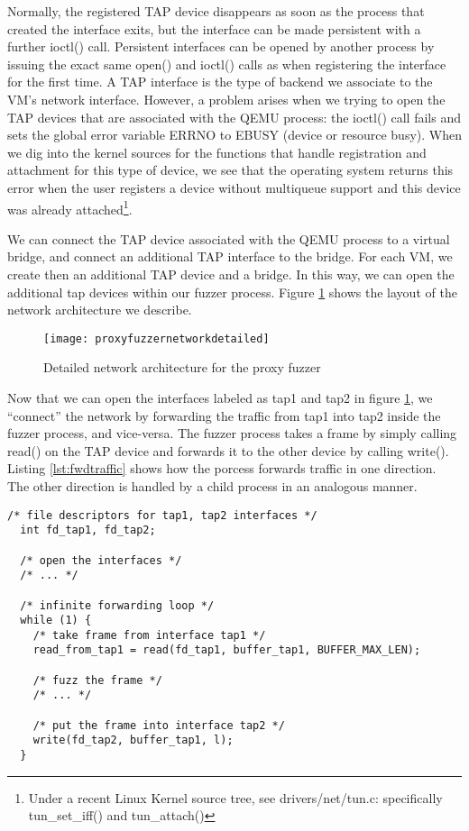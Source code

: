 Normally, the registered TAP device disappears as soon as the process that created the interface exits, but
the interface can be made persistent with a further ioctl() call. Persistent interfaces can be opened
by another process by issuing the exact same open() and ioctl() calls as when registering the interface
for the first time.
A TAP interface is the type of backend we associate to the VM's network interface. However, a problem arises
when we trying to open the TAP devices that are associated with the QEMU process: the ioctl() call
fails and sets the global error variable ERRNO to EBUSY (device or resource busy). When
we dig into the kernel sources for the functions that handle registration and attachment for this type of device,
we see that the operating system returns  this error when the user registers a device without multiqueue support and this device was already
attached\footnote{Under a recent Linux Kernel source tree, see drivers/net/tun.c: specifically tun\_set\_iff() and tun\_attach() }.


We can connect the TAP device associated with the QEMU process to a virtual bridge, and connect an additional TAP interface to the bridge.
For each VM, we create then an additional TAP device and a bridge. In this way, we can open the additional tap devices within our fuzzer
process. Figure \ref{fig:networkdetailed} shows the layout of the network architecture we describe.

\begin{figure}[h]
  \centering
  \texttt{[image: proxyfuzzernetworkdetailed]}
  \caption[Proxy fuzzer network architecture]{Detailed network architecture for the proxy fuzzer}
  \label{fig:networkdetailed}
\end{figure}

Now that we can open the interfaces labeled as tap1 and tap2 in figure \ref{fig:networkdetailed}, we ``connect'' the
network by forwarding the traffic from tap1 into tap2 inside the fuzzer process, and vice-versa. The fuzzer
process takes a frame by simply calling read() on the TAP device and forwards it to the other device by calling write().
Listing \ref{lst:fwdtraffic} shows how the porcess forwards traffic in one direction. The other direction is handled by a
child process in an analogous manner.

\begin{lstlisting}[caption={Forwarding traffic in the proxy fuzzer process}, label={lst:fwdtraffic},  style=CStyle, float, floatplacement=H]
  /* file descriptors for tap1, tap2 interfaces */
  int fd_tap1, fd_tap2;

  /* open the interfaces */
  /* ... */

  /* infinite forwarding loop */
  while (1) {
    /* take frame from interface tap1 */
    read_from_tap1 = read(fd_tap1, buffer_tap1, BUFFER_MAX_LEN);

    /* fuzz the frame */
    /* ... */

    /* put the frame into interface tap2 */
    write(fd_tap2, buffer_tap1, l);
  }
\end{lstlisting}

